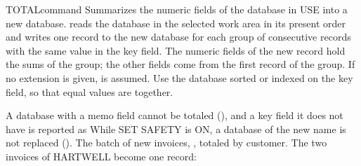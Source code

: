 \begin{XbaseEntry}{TOTAL}{command}
Summarizes the numeric fields of the database in USE into a new database.
\Syntax
{}
\Usage
{} reads the database in the selected work area in its present
order and writes one record to the new database for each group of
consecutive records with the same value in the key field.  The numeric
fields of the new record hold the sums of the group; the other fields come
from the first record of the group.  If no extension is given, 
is assumed.  Use the database sorted or indexed on the key field, so that
equal values are together.

A database with a memo field cannot be totaled (), and a key field it does not have is reported as
  While SET SAFETY is ON, a database of the new
name is not replaced ().
\Examples
The batch of new invoices, , totaled by customer.  The
two invoices of HARTWELL become one record:
\end{XbaseEntry}

